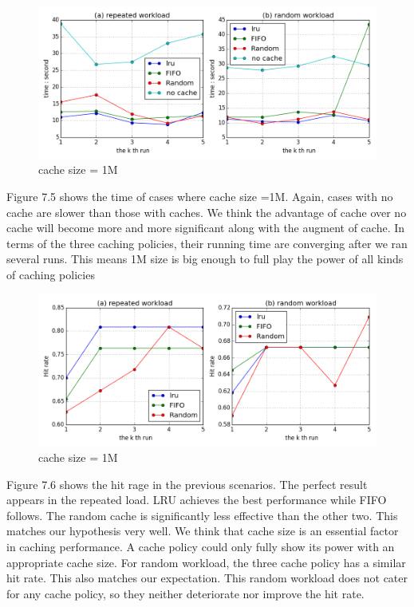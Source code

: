 \documentclass[paper=a4, fontsize=11pt]{scrartcl} %
\numberwithin{equation}{section} %
\numberwithin{figure}{section} %
\numberwithin{table}{section} %
\begin{document}
\begin{figure}[h]
  \centering
  \includegraphics[width=\textwidth]{../data/time1M}
  \caption{cache size = 1M}
  \label{fig:time1M}
\end{figure}
Figure 7.5 shows the time of cases where cache size =1M. Again, cases with no cache are slower than those with caches. We think the advantage of cache over no cache will become more and more significant along with the augment of cache. In terms of the three caching policies, their running time are converging after we ran several runs. This means 1M size is big enough to full play the power of all kinds of caching policies
\begin{figure}[h]
  \centering
  \includegraphics[width=\textwidth]{../data/hit1M}
  \caption{cache size = 1M}
  \label{fig:hit1M}
\end{figure}
Figure 7.6 shows the hit rage in the previous scenarios. The perfect result appears in the repeated load. LRU achieves the best performance while FIFO follows. The random cache is significantly less effective than the other two. This matches our hypothesis very well. We think that cache size is an essential factor in caching performance. A cache policy could only fully show its power with an appropriate cache size. For random workload, the three cache policy has a similar hit rate. This also matches our expectation. This random workload does not cater for any cache policy, so they neither deteriorate nor improve the hit rate. 
\end{document}
